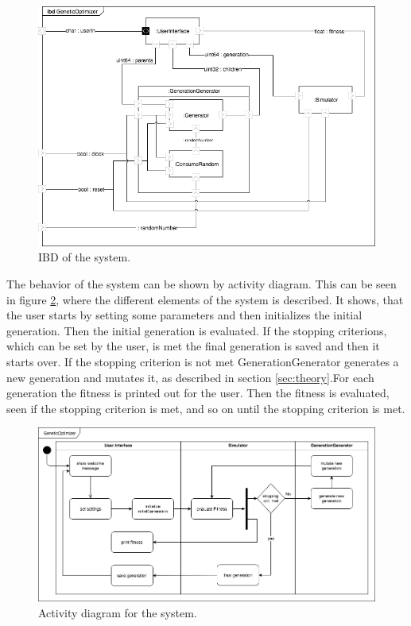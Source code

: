 \begin{figure}[htbp]
\begin{centering}
\includegraphics[width=\linewidth]{../diagrams/ibd.png}
\caption{IBD of the system.}
\label{fig:ibd}
\end{centering}
\end{figure}

The behavior of the system can be shown by activity diagram. This can be seen in figure \ref{fig:activity}, where the different elements of the system is described. It shows, that the user starts by setting some parameters and then initializes the initial generation. Then the initial generation is evaluated. If the stopping criterions, which can be set by the user, is met the final generation is saved and then it starts over. If the stopping criterion is not met GenerationGenerator generates a new generation and mutates it, as described in section \ref{sec:theory}.For each generation the fitness is printed out for the user. Then the fitness is evaluated, seen if the stopping criterion is met, and so on until the stopping criterion is met.

\begin{figure}[htbp]
\begin{centering}
\includegraphics[width=0.9\linewidth]{../diagrams/overallActivity.png}
\caption{Activity diagram for the system.}
\label{fig:activity}
\end{centering}
\end{figure}

